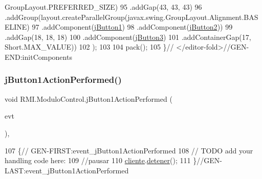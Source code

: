 \begin{DoxyCode}
      GroupLayout.PREFERRED\_SIZE)
95                 .addGap(43, 43, 43)
96                 .addGroup(layout.createParallelGroup(javax.swing.GroupLayout.Alignment.BASELINE)
97                     .addComponent(\mbox{\hyperlink{class_r_m_i_1_1_modulo_control_a925d9d1d7eff319b2573c334a20e3da1}{jButton1}})
98                     .addComponent(\mbox{\hyperlink{class_r_m_i_1_1_modulo_control_aa5861c17fe034c546e4c455e4c86b1ad}{jButton2}}))
99                 .addGap(18, 18, 18)
100                 .addComponent(\mbox{\hyperlink{class_r_m_i_1_1_modulo_control_af7702c5fb7079fd87c45617ca34997d2}{jButton3}})
101                 .addContainerGap(17, Short.MAX\_VALUE))
102         );
103 
104         pack();
105     \}\textcolor{comment}{// </editor-fold>//GEN-END:initComponents}
\end{DoxyCode}
\mbox{\label{class_r_m_i_1_1_modulo_control_aa1f3423a2628d662e839467d913f0b34}} 
\subsubsection{\texorpdfstring{j\+Button1\+Action\+Performed()}{jButton1ActionPerformed()}}
{\footnotesize\ttfamily void R\+M\+I.\+Modulo\+Control.\+j\+Button1\+Action\+Performed (\begin{DoxyParamCaption}\item[{java.\+awt.\+event.\+Action\+Event}]{evt }\end{DoxyParamCaption})\hspace{0.3cm}{\ttfamily [inline]}, {\ttfamily [private]}}


\begin{DoxyCode}
107                                                                          \{\textcolor{comment}{//
      GEN-FIRST:event\_jButton1ActionPerformed}
108         \textcolor{comment}{// TODO add your handling code here:}
109         \textcolor{comment}{//pausar}
110         \mbox{\hyperlink{class_r_m_i_1_1_modulo_control_affa108de8511c1fdd849d2d6a6304d4e}{cliente}}.\mbox{\hyperlink{class_r_m_i_1_1_cliente_a5b7c4cee8614116c01643bf47de62e7a}{detener}}();
111     \}\textcolor{comment}{//GEN-LAST:event\_jButton1ActionPerformed}
\end{DoxyCode}
\mbox{\label{class_r_m_i_1_1_modulo_control_a1ee8d16529785370c7fa377b78b54387}} 
